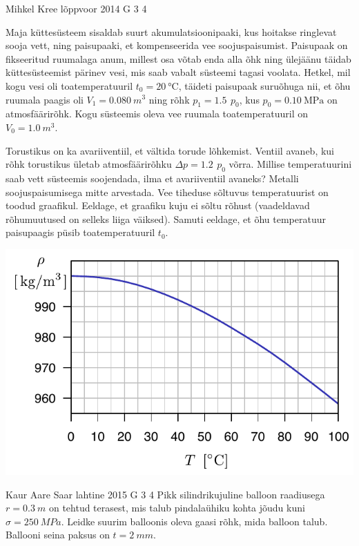 \documentclass[11pt, twoside]{article}
\begin{document}
{%
{Mihkel Kree} %
{lõppvoor} %
{2014} %
{G 3} %
{4} %
{
\ifStatement
Maja küttesüsteem sisaldab suurt akumulatsioonipaaki, kus hoitakse ringlevat sooja vett, ning paisupaaki, et kompenseerida vee soojuspaisumist. Paisupaak on fikseeritud ruumalaga anum, millest osa võtab enda alla õhk ning ülejäänu täidab küttesüsteemist pärinev vesi, mis saab vabalt süsteemi tagasi voolata. Hetkel, mil kogu vesi oli toatemperatuuril $t_0=\SI{20}{\celsius}$, täideti paisupaak suruõhuga nii, et õhu ruumala paagis oli $V_1=\SI{0.080}{m^3}$ ning rõhk $p_1=\SI{1.5}{}\,p_0$, kus $p_0=\SI{0.10}{\mega\pascal}$ on atmosfäärirõhk. Kogu süsteemis oleva vee ruumala toatemperatuuril on $V_0=\SI{1.0}{m^3}$.

Torustikus on ka avariiventiil, et vältida torude lõhkemist. Ventiil avaneb, kui rõhk torustikus ületab atmosfäärirõhku $\Delta p = \SI{1.2}{} \, p_0 $ võrra. Millise temperatuurini saab vett süsteemis soojendada, ilma et avariiventiil avaneks? Metalli soojuspaisumisega mitte arvestada. Vee tiheduse sõltuvus temperatuurist on toodud graafikul. Eeldage, et graafiku kuju ei sõltu rõhust (vaadeldavad rõhumuutused on selleks liiga väiksed). Samuti eeldage, et õhu temperatuur paisupaagis püsib toatemperatuuril $t_0$.

\begin{center}
\includegraphics[width=0.8\linewidth]{2014-v3g-03-veeTihedus}
\end{center}
\fi
}

{Kaur Aare Saar} %
{lahtine} %
{2015} %
{G 3} %
{4} %
{
\ifStatement
Pikk silindrikujuline balloon raadiusega $r=\SI{0,3}{m}$ on tehtud terasest, mis talub pindalaühiku kohta jõudu kuni $\sigma=\SI{250}{MPa}$. Leidke suurim balloonis oleva gaasi rõhk, mida balloon talub. Ballooni seina paksus on $t=\SI{2}{mm}$.
\fi
}

}
\end{document}
